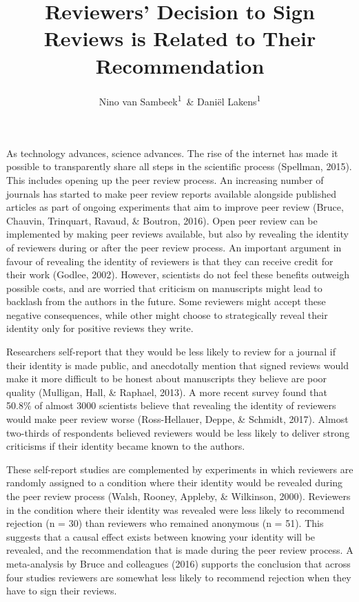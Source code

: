 \documentclass[,jou, a4paper,floatsintext]{apa6}
\title{Reviewers' Decision to Sign Reviews is Related to Their Recommendation}
\author{Nino van Sambeek\textsuperscript{1}~\& Daniël Lakens\textsuperscript{1}}
\date{}
\affiliation{
\vspace{0.5cm}
\textsuperscript{1} Eindhoven University of Technology, The Netherlands}
\begin{document}
\maketitle

As technology advances, science advances. The rise of the internet has made it possible to transparently share all steps in the scientific process (Spellman, 2015). This includes opening up the peer review process. An increasing number of journals has started to make peer review reports available alongside published articles as part of ongoing experiments that aim to improve peer review (Bruce, Chauvin, Trinquart, Ravaud, \& Boutron, 2016). Open peer review can be implemented by making peer reviews available, but also by revealing the identity of reviewers during or after the peer review process. An important argument in favour of revealing the identity of reviewers is that they can receive credit for their work (Godlee, 2002). However, scientists do not feel these benefits outweigh possible costs, and are worried that criticism on manuscripts might lead to backlash from the authors in the future. Some reviewers might accept these negative consequences, while other might choose to strategically reveal their identity only for positive reviews they write.

Researchers self-report that they would be less likely to review for a journal if their identity is made public, and anecdotally mention that signed reviews would make it more difficult to be honest about manuscripts they believe are poor quality (Mulligan, Hall, \& Raphael, 2013). A more recent survey found that 50.8\% of almost 3000 scientists believe that revealing the identity of reviewers would make peer review worse (Ross-Hellauer, Deppe, \& Schmidt, 2017). Almost two-thirds of respondents believed reviewers would be less likely to deliver strong criticisms if their identity became known to the authors.

These self-report studies are complemented by experiments in which reviewers are randomly assigned to a condition where their identity would be revealed during the peer review process (Walsh, Rooney, Appleby, \& Wilkinson, 2000). Reviewers in the condition where their identity was revealed were less likely to recommend rejection (n = 30) than reviewers who remained anonymous (n = 51). This suggests that a causal effect exists between knowing your identity will be revealed, and the recommendation that is made during the peer review process. A meta-analysis by Bruce and colleagues (2016) supports the conclusion that across four studies reviewers are somewhat less likely to recommend rejection when they have to sign their reviews.
\end{document}
